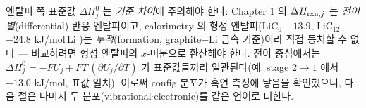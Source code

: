 엔탈피 쪽 표준값 $\Delta H^0_j$ 는 \emph{기준 차이}에 주의해야 한다: Chapter 1 의 $\Delta H_{\mathrm{rxn},j}$ 는
\emph{전이별}(differential) 반응 엔탈피이고, calorimetry 의 형성 엔탈피(LiC$_6$ $-13.9$, LiC$_{12}$ $-24.8$
kJ/mol\,Li \cite{chemmater2015})는 \emph{누적}(formation, graphite$+$Li 금속 기준)이라 직접 등치할 수 없다 ---
비교하려면 형성 엔탈피의 $x$-미분으로 환산해야 한다. 전이 중심에서는 $\Delta H^0_j=-FU_j+FT\,(\partial
U_j/\partial T)$ 가 표준값들끼리 일관된다(예: stage $2\to1$ 에서 $-13.0$ kJ/mol, 표값 일치). 이로써 config
분포가 흑연 측정에 닿음을 확인했으니, 다음 절은 나머지 두 분포(vibrational$\cdot$electronic)를 같은 언어로
더한다.

